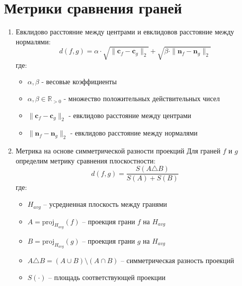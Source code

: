 \documentclass[a4paper,14pt]{extarticle}
\begin{document}
\section{Метрики сравнения граней}
\begin{enumerate}
    \item Евклидово расстояние между центрами и евклидовов расстояние между нормалями:
        \begin{equation}
            d(f,g) = \alpha \cdot \sqrt{\|\mathbf{c}_f - \mathbf{c}_g\|_2} + \sqrt{\beta \cdot \|\mathbf{n}_f - \mathbf{n}_g\|_2} 
        \end{equation}
        \noindent где:
        \begin{itemize}
            \item $\alpha, \beta$ - весовые коэффициенты
            \item $\alpha, \beta \in \mathbb{R}_{>0}$ - множество положительных действительных чисел
            \item $\|\mathbf{c}_f - \mathbf{c}_g\|_2$ - евклидово расстояние между центрами
            \item $\|\mathbf{n}_f - \mathbf{n}_g\|_2$ - евклидово расстояние между нормалями
        \end{itemize}

    \item Метрика на основе симметрической разности проекций
        Для граней $f$ и $g$ определим метрику сравнения плоскостности:
        \begin{equation}
            d(f,g) = \frac{S(A \triangle B)}{S(A) + S(B)}
        \end{equation}
        где:
        \begin{itemize}
            \item $H_{avg}$ -- усредненная плоскость между гранями

            \item $A = \text{proj}_{H_{avg}}(f)$ -- проекция грани $f$ на $H_{avg}$

            \item $B = \text{proj}_{H_{avg}}(g)$ -- проекция грани $g$ на $H_{avg}$

            \item $A \triangle B = (A \cup B) \setminus (A \cap B)$ -- симметрическая разность проекций

            \item $S(\cdot)$ -- площадь соответствующей проекции
        \end{itemize}


\end{enumerate}
\end{document}
